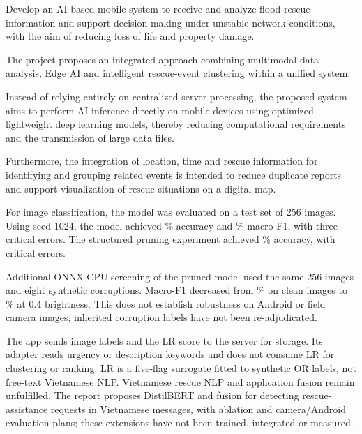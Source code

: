 
Develop an AI-based mobile system to receive and analyze flood rescue information and support decision-making under unstable network conditions, with the aim of reducing loss of life and property damage.

The project proposes an integrated approach combining multimodal data analysis, Edge AI and intelligent rescue-event clustering within a unified system.

Instead of relying entirely on centralized server processing, the proposed system aims to perform AI inference directly on mobile devices using optimized lightweight deep learning models, thereby reducing computational requirements and the transmission of large data files.

Furthermore, the integration of location, time and rescue information for identifying and grouping related events is intended to reduce duplicate reports and support visualization of rescue situations on a digital map.

For image classification, the model was evaluated on a test set of 256 images. Using seed 1024, the model achieved \NewImageAccuracy\% accuracy and \NewImageMacroFOne\% macro-F1, with three critical errors. The structured pruning experiment achieved \PruningAccuracy\% accuracy, with \PruningCriticalCount{} critical errors.

Additional ONNX CPU screening of the pruned model used the same 256 images and eight synthetic corruptions. Macro-F1 decreased from \QualityCleanMacroFOne\% on clean images to \QualityDarkMacroFOne\% at 0.4 brightness. This does not establish robustness on Android or field camera images; inherited corruption labels have not been re-adjudicated.

The app sends image labels and the LR score to the server for storage. Its adapter reads urgency or description keywords and does not consume LR for clustering or ranking. LR is a five-flag surrogate fitted to synthetic OR labels, not free-text Vietnamese NLP. Vietnamese rescue NLP and application fusion remain unfulfilled. The report proposes DistilBERT and fusion for detecting rescue-assistance requests in Vietnamese messages, with ablation and camera/Android evaluation plans; these extensions have not been trained, integrated or measured.

